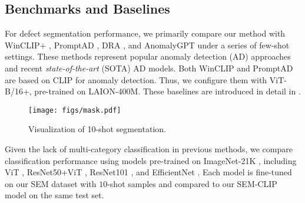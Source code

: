 \subsection{Benchmarks and Baselines}
For defect segmentation performance, we primarily compare our method with WinCLIP$+$ \cite{Jeong_2023_CVPR}, PromptAD \cite{li2024promptad}, DRA \cite{ding2022catching}, and AnomalyGPT \cite{gu2024anomalygpt} under a series of few-shot settings. These methods represent popular anomaly detection (AD) approaches and recent \textit{state-of-the-art} (SOTA) AD models. Both WinCLIP and PromptAD are based on CLIP for anomaly detection. Thus, we configure them with ViT-B/16+, pre-trained on LAION-400M. These baselines are introduced in detail in . 

\begin{figure*}[tb!]
  \centering
  \texttt{[image: figs/mask.pdf]}
  \caption{Visualization of 10-shot segmentation.}
  \label{Visualization of 10-shot segmentation}
\end{figure*}

Given the lack of multi-category classification in previous methods, we compare classification performance using models pre-trained on ImageNet-21K \cite{Dataset-2021NeurIPS-ImageNet-21K}, including ViT \cite{dosovitskiy2020image}, ResNet50+ViT \cite{dosovitskiy2020image}, ResNet101 \cite{he2016deep}, and EfficientNet \cite{tan2019efficientnet}. Each model is fine-tuned on our SEM dataset with $10$-shot samples and compared to our SEM-CLIP model on the same test set.


